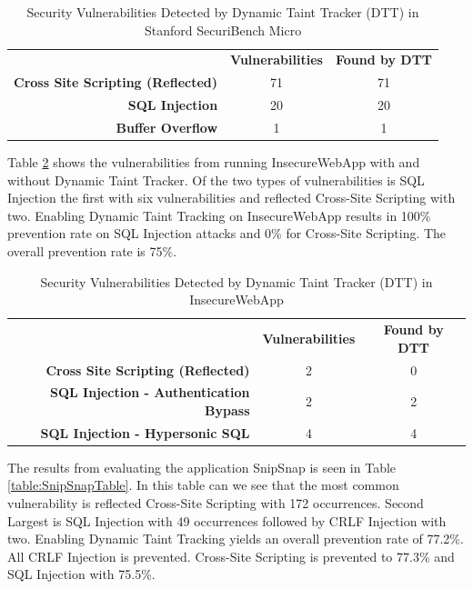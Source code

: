 \begin{table}[!hbt]
  \centering
  \caption{Security Vulnerabilities Detected by Dynamic Taint Tracker (DTT) in Stanford SecuriBench Micro}
  \label{table:MicroTable}
    \begin{tabular}{rcc}
      & \textbf{Vulnerabilities} & \textbf{Found by DTT} \\
      \textbf{Cross Site Scripting (Reflected)} & 71            & 71  \\
      \textbf{SQL Injection}                    & 20            & 20  \\
      \textbf{Buffer Overflow}                  & 1             & 1  
    \end{tabular}
\end{table}

Table \ref{table:InsecureTable} shows the vulnerabilities from running InsecureWebApp \parencite{insecure} with and without Dynamic Taint Tracker. Of the two types of vulnerabilities is SQL Injection the first with six vulnerabilities and reflected Cross-Site Scripting with two. Enabling Dynamic Taint Tracking on InsecureWebApp \parencite{insecure} results in 100\% prevention rate on SQL Injection attacks and 0\% for Cross-Site Scripting. The overall prevention rate is 75\%. 

\begin{table}[!hbt]
  \centering
  \caption{Security Vulnerabilities Detected by Dynamic Taint Tracker (DTT) in InsecureWebApp}
  \label{table:InsecureTable}
    \begin{tabular}{rcc}
      & \textbf{Vulnerabilities} & \textbf{Found by DTT} \\
      \textbf{Cross Site Scripting (Reflected)}      & 2             & 0  \\
      \textbf{SQL Injection - Authentication Bypass} & 2             & 2  \\
      \textbf{SQL Injection - Hypersonic SQL}        & 4             & 4  
    \end{tabular}
\end{table}

The results from evaluating the application SnipSnap \parencite{snipsnap} is seen in Table \ref{table:SnipSnapTable}. In this table can we see that the most common vulnerability is reflected Cross-Site Scripting with 172 occurrences. Second Largest is SQL Injection with 49 occurrences followed by CRLF Injection with two. Enabling Dynamic Taint Tracking yields an overall prevention rate of 77.2\%. All CRLF Injection is prevented. Cross-Site Scripting is prevented to 77.3\% and SQL Injection with 75.5\%.

